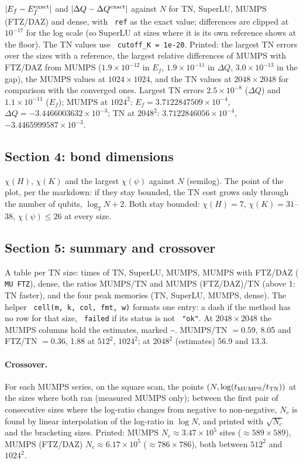 \documentclass[11pt]{article}
\renewcommand{\code}[1]{\texttt{\hyphenchar\font=-1 #1}}
\begin{document}
$|E_f-E_f^{\rm exact}|$ and $|\Delta Q-\Delta Q^{\rm exact}|$ against $N$ for TN, SuperLU, MUMPS (FTZ/DAZ) and dense, with \code{ref} as the exact value; differences
are clipped at $10^{-17}$ for the log scale (so SuperLU at sizes where it is its own reference shows at the floor). The TN values use
\code{cutoff\_K = 1e-20}. Printed: the largest TN errors over the sizes with a reference, the largest relative differences of MUMPS with FTZ/DAZ from MUMPS
($1.9\times10^{-12}$ in $E_f$, $1.9\times10^{-11}$ in $\Delta Q$, $3.0\times10^{-13}$ in the gap), the MUMPS values at $1024\times1024$, and the TN values at
$2048\times2048$ for comparison with the converged ones. Largest TN errors $2.5\times10^{-8}$ ($\Delta Q$) and $1.1\times10^{-11}$ ($E_f$); MUMPS at $1024^2$: $E_f = 3.7122847509\times10^{-4}$, $\Delta Q = -3.4466003632\times10^{-3}$; TN at $2048^2$: $3.7122846056\times10^{-4}$, $-3.4465999587\times10^{-3}$.

\subsection{Section 4: bond dimensions}

$\chi(H)$, $\chi(K)$ and the largest $\chi(\psi)$ against $N$ (semilog). The point of the plot, per the markdown: if they stay bounded, the TN cost
grows only through the number of qubits, $\log_2N+2$. Both stay bounded: $\chi(H) = 7$, $\chi(K) = 31$--38, $\chi(\psi)\le26$ at every size.

\subsection{Section 5: summary and crossover}

A table per TN size: times of TN, SuperLU, MUMPS, MUMPS with FTZ/DAZ (\code{MU FTZ}), dense, the ratios MUMPS/TN and MUMPS (FTZ/DAZ)/TN (above
1: TN faster), and the four peak memories (TN, SuperLU, MUMPS, dense). The helper \code{cell(m, k, col, fmt, w)} formats one entry: a dash if the
method has no row for that size, \code{failed} if its status is not \code{"ok"}. At $2048\times2048$ the MUMPS columns hold the estimates, marked
\textasciitilde. MUMPS/TN $= 0.59$, 8.05 and FTZ/TN $= 0.36$, 1.88 at $512^2$, $1024^2$; at $2048^2$ (estimates) 56.9 and 13.3.

\paragraph{Crossover.} For each MUMPS series, on the square scan, the points $(N, \log(t_{\rm MUMPS}/t_{\rm TN}))$ at the sizes where both ran
(measured MUMPS only); between the first pair of consecutive sizes where the log-ratio changes from negative to non-negative, $N_c$ is found by
linear interpolation of the log-ratio in $\log N$, and printed with $\sqrt{N_c}$ and the bracketing sizes. Printed: MUMPS $N_c\approx3.47\times10^5$
sites ($\approx589\times589$), MUMPS (FTZ/DAZ) $N_c\approx6.17\times10^5$ ($\approx786\times786$), both between $512^2$ and $1024^2$.
\end{document}
